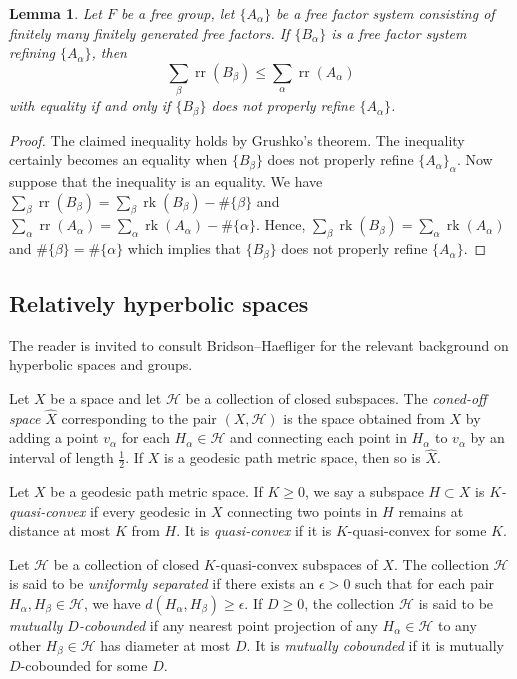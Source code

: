 \documentclass[11pt, a4paper]{amsart}
\newtheorem{lemma}[theorem]{Lemma}
\theoremstyle{definition}
\newcommand{\wh}[1]{\widehat{ #1 }}
\DeclareMathOperator{\rk}{rk}
\DeclareMathOperator{\rr}{rr}
\begin{document}
\begin{lemma}
\label{ff_inequality}
Let $F$ be a free group, let $\{A_{\alpha}\}$ be a free factor system consisting of finitely many finitely generated free factors. If $\{B_{\alpha}\}$ is a free factor system refining $\{A_{\alpha}\}$, then 
\[
\sum_{\beta}\rr(B_{\beta}) \leqslant \sum_{\alpha}\rr(A_{\alpha})
\]
with equality if and only if $\{B_{\beta}\}$ does not properly refine $\{A_{\alpha}\}$.
\end{lemma}

\begin{proof}
The claimed inequality holds by Grushko's theorem. The inequality certainly becomes an equality when $\{B_{\beta}\}$ does not properly refine $\{A_{\alpha}\}_{\alpha}$. Now suppose that the inequality is an equality. We have $\sum_{\beta}\rr(B_{\beta}) = \sum_{\beta}\rk(B_{\beta}) - \#\{\beta\}$ and $\sum_{\alpha}\rr(A_{\alpha}) = \sum_{\alpha}\rk(A_{\alpha}) - \#\{\alpha\}$. Hence,  $\sum_{\beta}\rk(B_{\beta}) = \sum_{\alpha}\rk(A_{\alpha})$ and $\#\{\beta\} = \#\{\alpha\}$ which implies that $\{B_{\beta}\}$ does not properly refine $\{A_{\alpha}\}$.
\end{proof}



\subsection{Relatively hyperbolic spaces}

The reader is invited to consult Bridson--Haefliger \cite{BH99} for the relevant background on hyperbolic spaces and groups.

Let $X$ be a space and let $\mathcal{H}$ be a collection of closed subspaces. The \emph{coned-off space} $\widehat{X}$ corresponding to the pair $(X, \mathcal{H})$ is the space obtained from $X$ by adding a point $v_{\alpha}$ for each $H_{\alpha}\in \mathcal{H}$ and connecting each point in $H_{\alpha}$ to $v_{\alpha}$ by an interval of length $\frac{1}{2}$. If $X$ is a geodesic path metric space, then so is $\wh{X}$.

Let $X$ be a geodesic path metric space. If $K\geqslant 0$, we say a subspace $H\subset X$ is \emph{$K$-quasi-convex} if every geodesic in $X$ connecting two points in $H$ remains at distance at most $K$ from $H$. It is \emph{quasi-convex} if it is $K$-quasi-convex for some $K$.

Let $\mathcal{H}$ be a collection of closed $K$-quasi-convex subspaces of $X$. The collection $\mathcal{H}$ is said to be \emph{uniformly separated} if there exists an $\epsilon>0$ such that for each pair $H_{\alpha}, H_{\beta}\in \mathcal{H}$, we have $d(H_{\alpha}, H_{\beta})\geqslant \epsilon$. If $D\geqslant 0$, the collection $\mathcal{H}$ is said to be \emph{mutually $D$-cobounded} if any nearest point projection of any $H_{\alpha}\in \mathcal{H}$ to any other $H_{\beta}\in \mathcal{H}$ has diameter at most $D$. It is \emph{mutually cobounded} if it is mutually $D$-cobounded for some $D$.
\end{document}
